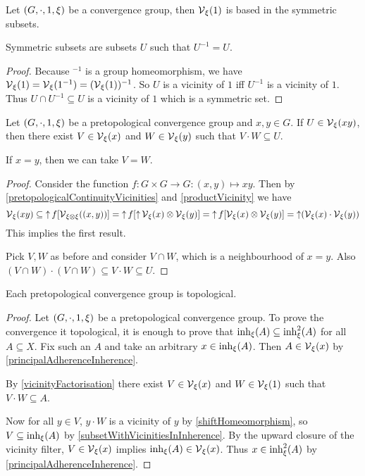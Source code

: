\begin{lemma} \label{symmetricBase}
Let $\sSet{G,\cdot, 1, \xi}$ be a convergence group, then $\operatorname{\mathcal{V}}_\xi(1)$ is based in the symmetric subsets.
\end{lemma}
Symmetric subsets are subsets $U$ such that $U^{-1} = U$.
\begin{proof}
Because $^{-1}$ is a group homeomorphism, we have $\operatorname{\mathcal{V}}_\xi(1) = \operatorname{\mathcal{V}}_\xi(1^{-1}) = (\operatorname{\mathcal{V}}_\xi(1))^{-1}$. So $U$ is a vicinity of $1$ iff $U^{-1}$ is a vicinity of $1$. Thus $U\cap U^{-1}\subseteq U$ is a vicinity of $1$ which is a symmetric set.
\end{proof}

\begin{lemma} \label{vicinityFactorisation}
Let $\sSet{G,\cdot, 1, \xi}$ be a pretopological convergence group and $x,y\in G$. If $U\in \operatorname{\mathcal{V}}_\xi(xy)$, then there exist $V\in \operatorname{\mathcal{V}}_\xi(x)$ and $W\in \operatorname{\mathcal{V}}_\xi(y)$ such that $V\cdot W\subseteq U$.

If $x=y$, then we can take $V = W$.
\end{lemma}
\begin{proof}
Consider the function $f: G\times G \to G: (x,y)\mapsto xy$. Then by \ref{pretopologicalContinuityVicinities} and \ref{productVicinity} we have
\[ \operatorname{\mathcal{V}}_\xi(xy) \subseteq \operatorname{\uparrow} f[\operatorname{\mathcal{V}}_{\xi\otimes\xi}((x,y))] = \operatorname{\uparrow} f[\operatorname{\uparrow} \operatorname{\mathcal{V}}_\xi(x)\otimes \operatorname{\mathcal{V}}_\xi(y)] = \operatorname{\uparrow} f[\operatorname{\mathcal{V}}_\xi(x)\otimes \operatorname{\mathcal{V}}_\xi(y)] = \operatorname{\uparrow} (\operatorname{\mathcal{V}}_\xi(x)\cdot \operatorname{\mathcal{V}}_\xi(y)) \]
This implies the first result.

Pick $V,W$ as before and consider $V\cap W$, which is a neighbourhood of $x=y$. Also $(V\cap W)\cdot(V\cap W) \subseteq V\cdot W \subseteq U$.
\end{proof}

\begin{proposition} \label{pretopologicalGroupConvergence}
Each pretopological convergence group is topological.
\end{proposition}
\begin{proof}
Let $\sSet{G,\cdot, 1, \xi}$ be a pretopological convergence group. To prove the convergence it topological, it is enough to prove that $\operatorname{inh}_\xi(A) \subseteq \operatorname{inh}^2_\xi(A)$ for all $A\subseteq X$. Fix such an $A$ and take an arbitrary $x\in \operatorname{inh}_\xi(A)$. Then $A\in \operatorname{\mathcal{V}}_\xi(x)$ by \ref{principalAdherenceInherence}.

By \ref{vicinityFactorisation} there exist $V\in \operatorname{\mathcal{V}}_\xi(x)$ and $W\in\operatorname{\mathcal{V}}_\xi(1)$ such that $V\cdot W \subseteq A$.

Now for all $y\in V$, $y\cdot W$ is a vicinity of $y$ by \ref{shiftHomeomorphism}, so $V \subseteq \operatorname{inh}_\xi(A)$ by \ref{subsetWithVicinitiesInInherence}. By the upward closure of the vicinity filter, $V\in \operatorname{\mathcal{V}}_\xi(x)$ implies $\operatorname{inh}_\xi(A) \in \operatorname{\mathcal{V}}_\xi(x)$. Thus $x\in \operatorname{inh}_\xi^2(A)$ by \ref{principalAdherenceInherence}.
\end{proof}

